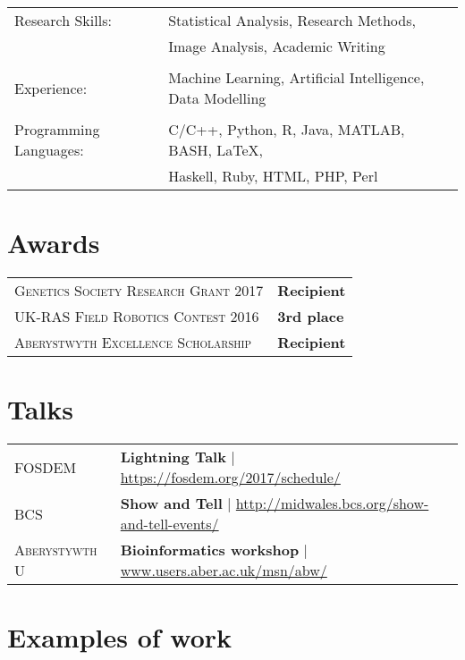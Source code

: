 \documentclass[a4paper,10pt]{article}
\begin{document}
\begin{tabular}{ll}


  Research Skills: & Statistical Analysis, Research Methods,\\& Image Analysis, Academic Writing

  \\

  \\

  Experience: & Machine Learning, Artificial Intelligence, Data Modelling

  \\

  \\


  Programming Languages: & C/C++, Python, R, Java, MATLAB, BASH, \LaTeX,\\& Haskell, Ruby, HTML, PHP, Perl


\end{tabular}


\section{Awards}
\begin{tabular}{ll}
  \textsc{Genetics Society Research Grant 2017}& \textbf{Recipient}
  \\
  \textsc{UK-RAS Field Robotics Contest 2016}& \textbf{3rd place}
  \\
  \textsc{Aberystwyth Excellence Scholarship}& \textbf{Recipient}
\end{tabular}


\section{Talks}
\begin{tabular}{ll}

  \textsc{FOSDEM} & \textbf{Lightning Talk} | \href{https://fosdem.org/2017/schedule/}{https://fosdem.org/2017/schedule/} \\
  \textsc{BCS} & \textbf{Show and Tell} | \href{http://www.midwales.bcs.org/show-and-tell-events/}{http://midwales.bcs.org/show-and-tell-events/}\\
  \textsc{Aberystywth U} & \textbf{Bioinformatics workshop} | \href{www.users.aber.ac.uk/msn/abw/index.html}{www.users.aber.ac.uk/msn/abw/}

\end{tabular}


\section{Examples of work}
\end{document}
